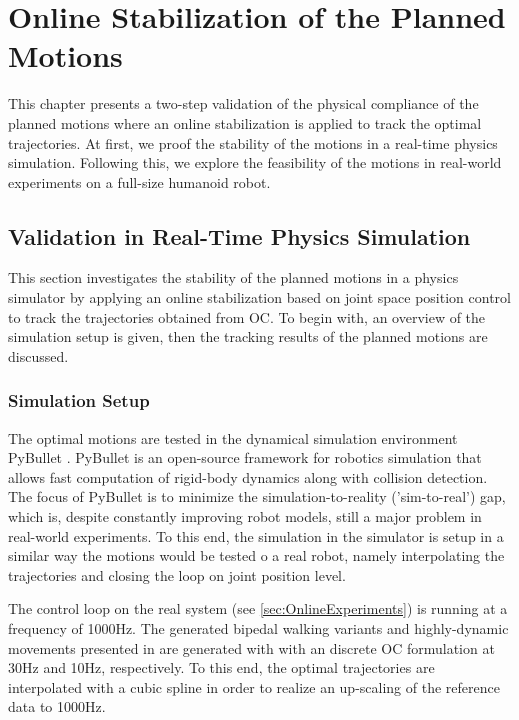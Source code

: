 
\chapter{Online Stabilization of the Planned Motions}\label{c6}
This chapter presents a two-step validation of the physical compliance of the planned motions where an online stabilization is applied to track the optimal trajectories. At first, we proof the stability of the motions in a real-time physics simulation. Following this, we explore the feasibility of the motions in real-world experiments on a full-size humanoid robot.    

\section{Validation in Real-Time Physics Simulation}\label{sec:OnlineSimulation}
This section investigates the stability of the planned motions in a physics simulator by applying an online stabilization based on joint space position control to track the trajectories obtained from \gls{OC}. To begin with, an overview of the simulation setup is given, then the tracking results of the planned motions are discussed. 

\subsection{Simulation Setup}
The optimal motions are tested in the dynamical simulation environment PyBullet \cite{coumans2016pybullet}. PyBullet is an open-source framework for robotics simulation that allows fast computation of rigid-body dynamics along with collision detection. The focus of PyBullet is to minimize the simulation-to-reality ('sim-to-real') gap, which is, despite constantly improving robot models, still a major problem in real-world experiments. To this end, the simulation in the simulator is setup in a similar way the motions would be tested o a real robot, namely interpolating the trajectories and closing the loop on joint position level.

The control loop on the real system (see \cref{sec:OnlineExperiments}) is running at a frequency of 1000Hz. The generated bipedal walking variants and highly-dynamic movements presented in  are generated with with an discrete \gls{OC} formulation at 30Hz and 10Hz, respectively. To this end, the optimal trajectories are interpolated with a cubic spline in order to realize an up-scaling of the reference data to 1000Hz.  

